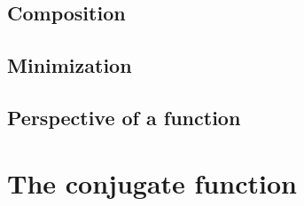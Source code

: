\subsection{Composition}
\begin{example}
\end{example}
\begin{example}
\end{example}
\begin{remark}
\end{remark}
\begin{example}
\end{example}

\subsection{Minimization}
\begin{example}
\end{example}
\begin{example}
\end{example}
\begin{example}
\end{example}

\subsection{Perspective of a function}
\begin{example}
\end{example}
\begin{example}
\end{example}
\begin{example}
\end{example}

\section{The conjugate function}

